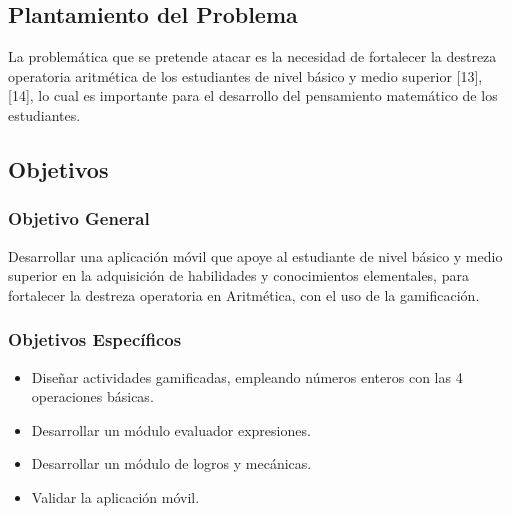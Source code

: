 \documentclass{article}
\begin{document}
\subsection{Plantamiento del Problema}
La problemática que se pretende atacar es la necesidad de fortalecer la destreza operatoria aritmética de los estudiantes de nivel básico y  medio superior [13], [14], lo cual es importante para el desarrollo del pensamiento matemático de los estudiantes. 
\subsection{Objetivos}
\subsubsection{Objetivo General}Desarrollar una aplicación móvil que apoye al estudiante de nivel básico y  medio superior en la 
adquisición de habilidades y conocimientos elementales, para fortalecer la destreza 
operatoria en  Aritmética, con el uso de la gamificación.

\subsubsection{Objetivos Específicos}
\begin{itemize}
	\item Diseñar actividades gamificadas, empleando números enteros con las 4 operaciones básicas.
	\item Desarrollar un módulo evaluador expresiones.
	\item Desarrollar un módulo de logros y mecánicas.
	\item Validar la aplicación móvil. 
\end{itemize}
\end{document}
